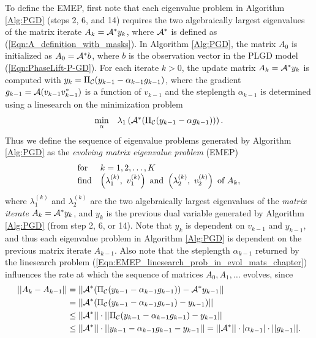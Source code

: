 To define the EMEP, first note that each eigenvalue problem in Algorithm \ref{Alg:PGD} (steps 2, 6, and 14) requires the two algebraically largest eigenvalues of the matrix iterate $A_k = {\mathcal A}^*y_k$, where ${\mathcal A}^*$ is defined as (\ref{Eqn:A_definition_with_masks}).
In Algorithm \ref{Alg:PGD}, the matrix $A_0$ is initialized as $A_0 = {\mathcal A}^*b$, where $b$ is the observation vector in the PLGD model (\ref{Eqn:PhaseLift-P-GD}).
For each iterate $k >0$, the update matrix $A_k = {\mathcal A}^*y_k$ is computed with $y_k = \Pi_{{\mathcal C}}(y_{k-1}- \alpha_{k-1}  g_{k-1})$, where the gradient $g_{k-1} = {\mathcal A}(v_{k-1} v_{k-1}^*)$ is a function of $v_{k-1}$ and the steplength $\alpha_{k-1}$ is determined using a linesearch on the minimization problem
\begin{equation}			\label{Eqn:EMEP_linesearch_prob_in_evol_mats_chapter}
\begin{array}{ll}
\min\limits_{\substack{\alpha}}
	&	\lambda_1 \left( {\mathcal A}^* ( \Pi_{\mathcal C} ( y_{k-1} - \alpha g_{k-1} ) )  \right).
\end{array}
\end{equation}
Thus we define the sequence of eigenvalue problems generated by Algorithm \ref{Alg:PGD} as the \textit{evolving matrix eigenvalue problem} (EMEP)
\begin{equation}		\label{Eqn:EMEP_PLGD}
\begin{array}{ll}
\textnormal{for}
	&	k = 1, 2, \ldots, K		\\
\textnormal{find}	
	&	\left( \lambda^{(k)}_1, \ v^{(k)}_1 \right) \textnormal{ and } \left( \lambda^{(k)}_2, \ v^{(k)}_2 \right) \textnormal{ of } A_k,
\end{array}
\end{equation}
where $\lambda^{(k)}_1$ and $\lambda^{(k)}_2$ are the two algebraically largest eigenvalues of the \textit{matrix iterate} $A_k = {\mathcal A}^*y_k$, and $y_k$ is the previous dual variable generated by Algorithm \ref{Alg:PGD} (from step 2, 6, or 14).
Note that $y_k$ is dependent on $v_{k-1}$ and $y_{k-1}$, and thus each eigenvalue problem in Algorithm \ref{Alg:PGD} is dependent on the previous matrix iterate $A_{k-1}$.
Also note that the steplength $\alpha_{k-1}$ returned by the linesearch problem (\ref{Eqn:EMEP_linesearch_prob_in_evol_mats_chapter}) influences the rate at which the sequence of matrices $A_0, A_1, \ldots$ evolves, since
\begin{equation}
\begin{split}
||A_k - A_{k-1}||
	& = ||{\mathcal A}^* ( \Pi_{\mathcal C} ( y_{k-1} - \alpha_{k-1} g_{k-1})) - {\mathcal A}^*y_{k-1} ||		\\
	& = ||{\mathcal A}^* ( \Pi_{\mathcal C} ( y_{k-1} - \alpha_{k-1} g_{k-1}) - y_{k-1}) ||		\\
	& \leq ||{\mathcal A}^*|| \cdot || \Pi_{\mathcal C} ( y_{k-1} - \alpha_{k-1} g_{k-1}) - y_{k-1} ||	 	\\
	& \leq ||{\mathcal A}^*|| \cdot || y_{k-1} - \alpha_{k-1} g_{k-1} - y_{k-1} || 
		= ||{\mathcal A}^*|| \cdot |\alpha_{k-1}| \cdot	||g_{k-1}||.	\\
\end{split}
\end{equation}




